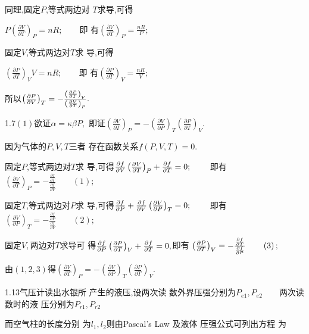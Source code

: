 \documentclass{article}
\begin{document}
同理,固定$P$,等式两边对%
$T$求导,可得

$P\left( \frac{\partial V}{\partial T}\right) _{P}=nR;\qquad $即%
有\qquad $\left( \frac{\partial V}{\partial T}\right) _{P}=\frac{nR}{P}%
;$

固定$V$,等式两边对$T$求%
导,可得

$\left( \frac{\partial P}{\partial T}\right) _{V}V=nR;\qquad $即%
有\qquad $\left( \frac{\partial P}{\partial T}\right) _{V}=\frac{nR}{V}%
;$

所以\qquad $\left( \frac{\partial P}{\partial V}\right) _{T}=-%
\frac{\left( \frac{\partial P}{\partial T}\right) _{V}}{\left( \frac{%
\partial V}{\partial T}\right) _{P}}.$

1.7\qquad $\left( 1\right) $欲证\qquad $\alpha =\kappa \beta P,$%
即证\qquad $\left( \frac{\partial V}{\partial T}\right)
_{P}=-\left( \frac{\partial V}{\partial P}\right) _{T}\left( \frac{\partial P%
}{\partial T}\right) _{V}.$

因为\qquad 气体的$P,V,T$三者%
存在函数关系\qquad $f\left( P,V,T\right)
=0.$

固定$P$,等式两边对$T$求%
导,可得\qquad $\frac{\partial f}{\partial V}\left( \frac{%
\partial V}{\partial T}\right) _{P}+\frac{\partial f}{\partial T}=0;\qquad $%
即有\qquad $\left( \frac{\partial V}{\partial T}\right) _{P}=-%
\frac{\frac{\partial f}{\partial T}}{\frac{\partial f}{\partial V}}\qquad
\left( 1\right) ;$

固定$T$,等式两边对$P$求%
导,可得$\frac{\partial f}{\partial P}+\frac{\partial f}{%
\partial V}\left( \frac{\partial V}{\partial P}\right) _{T}=0;\qquad $%
即有\qquad $\left( \frac{\partial V}{\partial P}\right) _{T}=-%
\frac{\frac{\partial f}{\partial P}}{\frac{\partial f}{\partial V}}\qquad
\left( 2\right) ;$

固定$V,$两边对$T$求导可%
得\qquad $\frac{\partial f}{\partial P}\left( \frac{\partial P}{%
\partial T}\right) _{V}+\frac{\partial f}{\partial T}=0,$即有%
\qquad $\left( \frac{\partial P}{\partial T}\right) _{V}=-\frac{\frac{%
\partial f}{\partial T}}{\frac{\partial f}{\partial P}}\qquad \left(
3\right) ;$

由$\left( 1,2,3\right) $得\qquad \qquad $\left( \frac{\partial V%
}{\partial T}\right) _{P}=-\left( \frac{\partial V}{\partial P}\right)
_{T}\left( \frac{\partial P}{\partial T}\right) _{V}.$

1.13\qquad 气压计读出水银所%
产生的液压,设两次读%
数外界压强分别为$%
P_{e1},P_{e2}\qquad $两次读数时的液%
压分别为\qquad $P_{r1},P_{r2}$

而空气柱的长度分别%
为$l_{1},l_{2}$则由Pascal's Law 及液体%
压强公式可列出方程%
为
\end{document}
